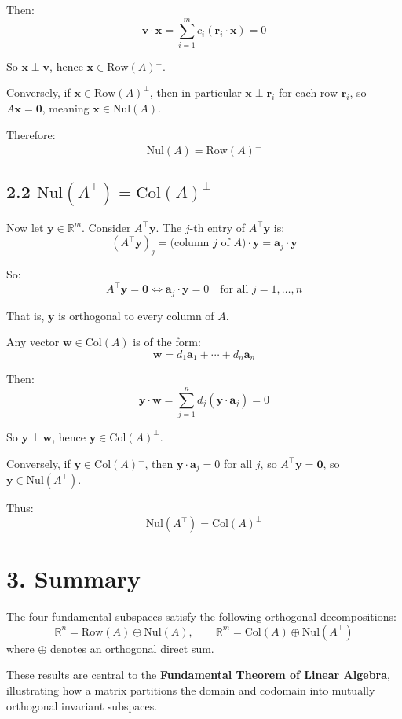 \documentclass[11pt]{article}
\begin{document}
Then:
\[
\mathbf{v} \cdot \mathbf{x} = \sum_{i=1}^m c_i (\mathbf{r}_i \cdot \mathbf{x}) = 0
\]

So \( \mathbf{x} \perp \mathbf{v} \), hence \( \mathbf{x} \in \mathrm{Row}(A)^\perp \).

Conversely, if \( \mathbf{x} \in \mathrm{Row}(A)^\perp \), then in particular \( \mathbf{x} \perp \mathbf{r}_i \) for each row \( \mathbf{r}_i \), so \( A\mathbf{x} = \mathbf{0} \), meaning \( \mathbf{x} \in \mathrm{Nul}(A) \).

Therefore:
\[
\boxed{\mathrm{Nul}(A) = \mathrm{Row}(A)^\perp}
\]

\subsection*{2.2 \( \mathrm{Nul}(A^\top) = \mathrm{Col}(A)^\perp \)}

Now let \( \mathbf{y} \in \mathbb{R}^m \). Consider \( A^\top \mathbf{y} \). The \( j \)-th entry of \( A^\top \mathbf{y} \) is:
\[
(A^\top \mathbf{y})_j = \text{(column } j \text{ of } A) \cdot \mathbf{y} = \mathbf{a}_j \cdot \mathbf{y}
\]

So:
\[
A^\top \mathbf{y} = \mathbf{0} \iff \mathbf{a}_j \cdot \mathbf{y} = 0 \quad \text{for all } j = 1, \dots, n
\]

That is, \( \mathbf{y} \) is orthogonal to every column of \( A \).

Any vector \( \mathbf{w} \in \mathrm{Col}(A) \) is of the form:
\[
\mathbf{w} = d_1 \mathbf{a}_1 + \cdots + d_n \mathbf{a}_n
\]

Then:
\[
\mathbf{y} \cdot \mathbf{w} = \sum_{j=1}^n d_j (\mathbf{y} \cdot \mathbf{a}_j) = 0
\]

So \( \mathbf{y} \perp \mathbf{w} \), hence \( \mathbf{y} \in \mathrm{Col}(A)^\perp \).

Conversely, if \( \mathbf{y} \in \mathrm{Col}(A)^\perp \), then \( \mathbf{y} \cdot \mathbf{a}_j = 0 \) for all \( j \), so \( A^\top \mathbf{y} = \mathbf{0} \), so \( \mathbf{y} \in \mathrm{Nul}(A^\top) \).

Thus:
\[
\boxed{\mathrm{Nul}(A^\top) = \mathrm{Col}(A)^\perp}
\]

\section*{3. Summary}

The four fundamental subspaces satisfy the following orthogonal decompositions:
\[
\mathbb{R}^n = \mathrm{Row}(A) \oplus \mathrm{Nul}(A), \qquad
\mathbb{R}^m = \mathrm{Col}(A) \oplus \mathrm{Nul}(A^\top)
\]
where \( \oplus \) denotes an orthogonal direct sum.

These results are central to the \textbf{Fundamental Theorem of Linear Algebra}, illustrating how a matrix partitions the domain and codomain into mutually orthogonal invariant subspaces.
\end{document}
